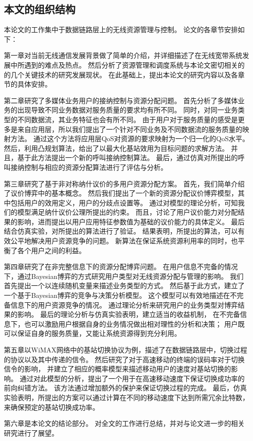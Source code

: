 \subsection{本文的组织结构}
本论文的工作集中于数据链路层上的无线资源管理与控制。
论文的各章节安排如下：

第一章对当前无线通信发展背景做了简单的介绍，并详细描述了在无线宽带系统发展中所遇到的难点及热点。
然后分析了资源管理和调度系统与本论文密切相关的的几个关键技术的研究发展现状。
在此基础上，提出本论文的研究内容以及各章节的具体安排。
\par %

第二章研究了多媒体业务用户的接纳控制与资源分配问题。
首先分析了多媒体业务的出现导致不同业务数据对服务质量的要求均有所不同。
同时，对同一业务类型的不同数据流，其业务特征也会有所不同。
由于用户对于服务质量的感受是更多是来自应用层，所以我们提出了一个针对不同业务及不同数据流的服务质量的映射方法。
通过这个方法将应用层QoS对资源的要求映射为一个归一化的QoS水平。
然后，利用凸规划算法，给出了以最大化基站效用为目标问题的求解方法。
并且，基于此方法提出一个新的呼叫接纳控制算法。
最后，通过仿真对所提出的呼叫接纳控制与相应的资源分配算法进行了评估与分析。


第三章研究了基于非对称纳什议价的多用户资源分配方案。
首先，我们简单介绍了议价博弈中的基本概念。
然后我们提出了一个新的资源分配议价博弈模型，其中包括用户的效用定义，用户的分歧点设置等。
通过对模型的理论分析，可知我们的模型满足纳什议价公理所提出的约束。
而且，讨论了用户议价能力对分配结果的影响，进而提出以用户应用特征参数值为基础的议价能力的具体定义。
最后结合仿真实验，对所提出的算法进行了验证。
结果表明，所提出的算法，可以有效公平地解决用户资源竞争的问题。
新算法在保证系统资源利用率的同时，也平衡了各个用户之间的利益。


第四章研究了在非完整信息下的资源分配博弈问题。
在用户信息不完备的情况下，通过Bayesian博弈的方式研究用户类型对无线资源分配与管理的影响。
我们首先提出一个以连续随机变量来描述业务类型的方式。
然后基于此方式，建立了一个基于Bayesian博弈的竞争与决策分析模型。
这个模型可以有效地描述在不完备信息下的用户资源竞争的情况。
通过理论分析来研究用户的业务类型对博弈结果的影响。
最后的理论分析与仿真实验表明，建立适当的收益机制，
在不完备信息下，也可以激励用户根据自身的业务情况做出相对理性的分析和决策；
用户既可以保证自身的服务质量，又能让系统资源得到充分利用。

第五章以WiMAX网络中的基站切换协议为例，描述了在数据链路层中，切换过程的协议以及其中传递的信令。
然后研究了对于高速移动的终端的误码率对于切换信令的影响，
并建立了相应的概率模型来描述移动用户的速度对基站切换的影响。
通过对此模型的分析，提出了一个用于在高速移动速度下保证切换成功率的前向纠错方法。
该方法通过增加额外的保护来保证切换过程的完成。
最后，仿真实验表明，所提出的方案可以通过计算在不同的移动速度下达到所需冗余比特数，来确保预定的基站切换成功率。

\par 第六章是本论文的结论部分。
对全文的工作进行总结，并对与论文进一步的相关研究进行了展望。
